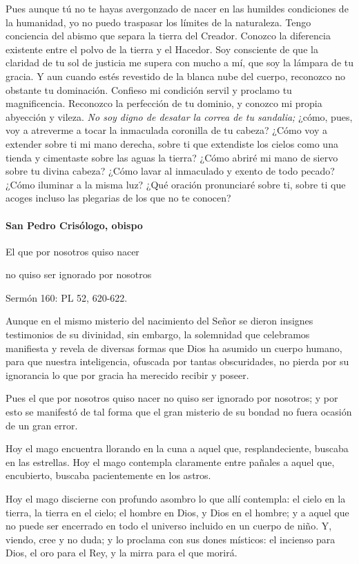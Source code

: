 \documentclass[]{article}
\let\oldparagraph\paragraph
\renewcommand{\paragraph}[1]{\oldparagraph{#1}\mbox{}}
\begin{document}
Pues aunque tú no te hayas avergonzado de nacer en las humildes
condiciones de la humanidad, yo no puedo traspasar los límites de la
naturaleza. Tengo conciencia del abismo que separa la tierra del
Creador. Conozco la diferencia existente entre el polvo de la tierra y
el Hacedor. Soy consciente de que la claridad de tu sol de justicia me
supera con mucho a mí, que soy la lámpara de tu gracia. Y aun cuando
estés revestido de la blanca nube del cuerpo, reconozco no obstante tu
dominación. Confieso mi condición servil y proclamo tu magnificencia.
Reconozco la perfección de tu dominio, y conozco mi propia abyección y
vileza. \emph{No soy digno de desatar la correa de tu sandalia;} ¿cómo,
pues, voy a atreverme a tocar la inmaculada coronilla de tu cabeza?
¿Cómo voy a extender sobre ti mi mano derecha, sobre ti que extendiste
los cielos como una tienda y cimentaste sobre las aguas la tierra? ¿Cómo
abriré mi mano de siervo sobre tu divina cabeza? ¿Cómo lavar al
inmaculado y exento de todo pecado? ¿Cómo iluminar a la misma luz? ¿Qué
oración pronunciaré sobre ti, sobre ti que acoges incluso las plegarias
de los que no te conocen?

\paragraph{San Pedro Crisólogo,
obispo}\label{san-pedro-crisuxf3logo-obispo-1}

El que por nosotros quiso nacer

no quiso ser ignorado por nosotros

Sermón 160: PL 52, 620-622.

Aunque en el mismo misterio del nacimiento del Señor se dieron insignes
testimonios de su divinidad, sin embargo, la solemnidad que celebramos
manifiesta y revela de diversas formas que Dios ha asumido un cuerpo
humano, para que nuestra inteligencia, ofuscada por tantas obscuridades,
no pierda por su ignorancia lo que por gracia ha merecido recibir y
poseer.

Pues el que por nosotros quiso nacer no quiso ser ignorado por nosotros;
y por esto se manifestó de tal forma que el gran misterio de su bondad
no fuera ocasión de un gran error.

Hoy el mago encuentra llorando en la cuna a aquel que, resplandeciente,
buscaba en las estrellas. Hoy el mago contempla claramente entre pañales
a aquel que, encubierto, buscaba pacientemente en los astros.

Hoy el mago discierne con profundo asombro lo que allí contempla: el
cielo en la tierra, la tierra en el cielo; el hombre en Dios, y Dios en
el hombre; y a aquel que no puede ser encerrado en todo el universo
incluido en un cuerpo de niño. Y, viendo, cree y no duda; y lo proclama
con sus dones místicos: el incienso para Dios, el oro para el Rey, y la
mirra para el que morirá.
\end{document}
